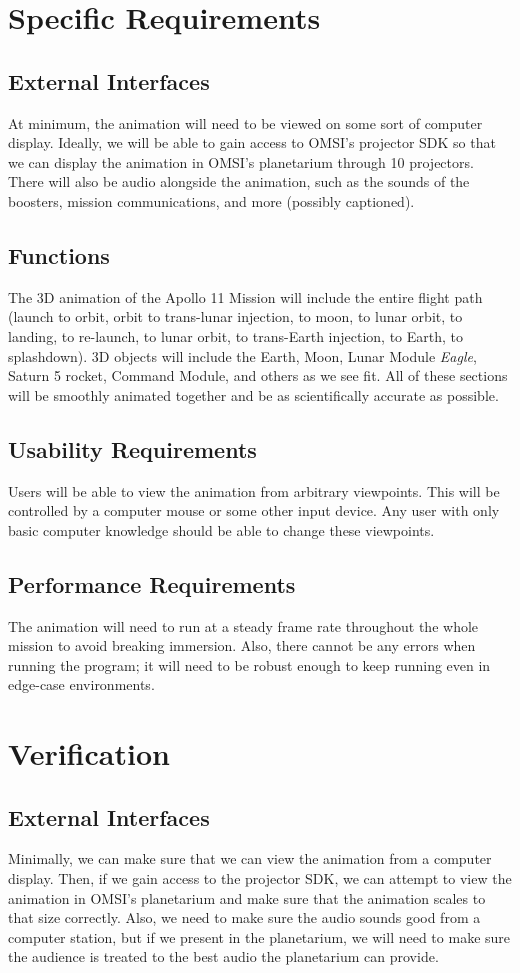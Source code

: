 \documentclass[onecolumn, draftclsnofoot,10pt, compsoc]{IEEEtran}
\begin{document}
\section{Specific Requirements}
    \subsection{External Interfaces}
    At minimum, the animation will need to be viewed on some sort of computer display. Ideally, we will be able to gain access to OMSI's projector SDK so that we can display the animation in OMSI's planetarium through 10 projectors. There will also be audio alongside the animation, such as the sounds of the boosters, mission communications, and more (possibly captioned).
    \subsection{Functions}
    The 3D animation of the Apollo 11 Mission will include the entire flight path (launch to orbit, orbit to trans-lunar injection, to moon, to lunar orbit, to landing, to re-launch, to lunar orbit, to trans-Earth injection, to Earth, to splashdown). 3D objects will include the Earth, Moon, Lunar Module \textit{Eagle}, Saturn 5 rocket, Command Module, and others as we see fit. All of these sections will be smoothly animated together and be as scientifically accurate as possible.
    \subsection{Usability Requirements}
    Users will be able to view the animation from arbitrary viewpoints. This will be controlled by a computer mouse or some other input device. Any user with only basic computer knowledge should be able to change these viewpoints.
    \subsection{Performance Requirements}
    The animation will need to run at a steady frame rate throughout the whole mission to avoid breaking immersion. Also, there cannot be any errors when running the program; it will need to be robust enough to keep running even in edge-case environments.
\section{Verification}
    \subsection{External Interfaces}
    Minimally, we can make sure that we can view the animation from a computer display. Then, if we gain access to the projector SDK, we can attempt to view the animation in OMSI's planetarium and make sure that the animation scales to that size correctly. Also, we need to make sure the audio sounds good from a computer station, but if we present in the planetarium, we will need to make sure the audience is treated to the best audio the planetarium can provide. 
\end{document}
